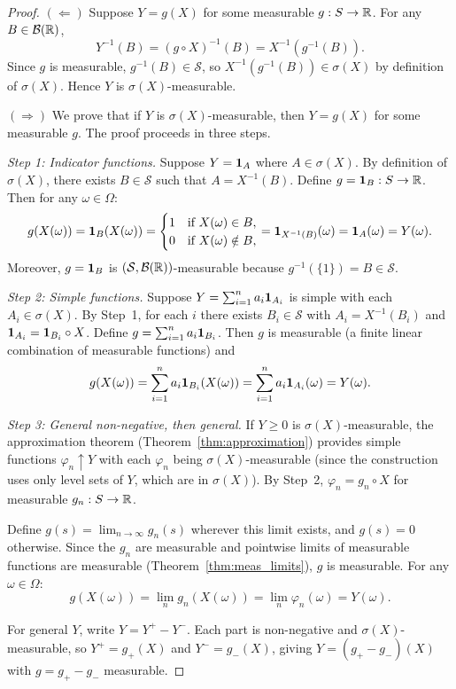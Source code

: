 \documentclass[11pt,a4paper]{article}
\begin{document}
\begin{proof}
$(\Leftarrow)$ Suppose $Y = g(X)$ for some measurable $g: S \to \mathbb{R}$.
For any $B \in \mathcal{B}(\mathbb{R})$,
\[
  Y^{-1}(B) = (g \circ X)^{-1}(B) = X^{-1}(g^{-1}(B)).
\]
Since $g$ is measurable, $g^{-1}(B) \in \mathcal{S}$, so
$X^{-1}(g^{-1}(B)) \in \sigma(X)$ by definition of $\sigma(X)$.
Hence $Y$ is $\sigma(X)$-measurable.

$(\Rightarrow)$ We prove that if $Y$ is $\sigma(X)$-measurable, then
$Y = g(X)$ for some measurable $g$. The proof proceeds in three steps.

\textit{Step 1: Indicator functions.}
Suppose $Y = \mathbf{1}_A$ where $A \in \sigma(X)$. By definition of
$\sigma(X)$, there exists $B \in \mathcal{S}$ such that $A = X^{-1}(B)$.
Define $g = \mathbf{1}_B: S \to \mathbb{R}$. Then for any $\omega \in \Omega$:
\[
  g(X(\omega)) = \mathbf{1}_B(X(\omega))
  = \begin{cases} 1 & \text{if } X(\omega) \in B, \\
                  0 & \text{if } X(\omega) \notin B, \end{cases}
  = \mathbf{1}_{X^{-1}(B)}(\omega) = \mathbf{1}_A(\omega) = Y(\omega).
\]
Moreover, $g = \mathbf{1}_B$ is $(\mathcal{S}, \mathcal{B}(\mathbb{R}))$-measurable
because $g^{-1}(\{1\}) = B \in \mathcal{S}$.

\textit{Step 2: Simple functions.}
Suppose $Y = \sum_{i=1}^n a_i \mathbf{1}_{A_i}$ is simple with each
$A_i \in \sigma(X)$. By Step~1, for each $i$ there exists
$B_i \in \mathcal{S}$ with $A_i = X^{-1}(B_i)$ and
$\mathbf{1}_{A_i} = \mathbf{1}_{B_i} \circ X$. Define
$g = \sum_{i=1}^n a_i \mathbf{1}_{B_i}$. Then $g$ is measurable (a finite
linear combination of measurable functions) and
\[
  g(X(\omega)) = \sum_{i=1}^n a_i \mathbf{1}_{B_i}(X(\omega))
  = \sum_{i=1}^n a_i \mathbf{1}_{A_i}(\omega) = Y(\omega).
\]

\textit{Step 3: General non-negative, then general.}
If $Y \geq 0$ is $\sigma(X)$-measurable, the approximation theorem
(Theorem~\ref{thm:approximation}) provides simple functions
$\varphi_n \uparrow Y$ with each $\varphi_n$ being $\sigma(X)$-measurable
(since the construction uses only level sets of $Y$, which are in
$\sigma(X)$). By Step~2, $\varphi_n = g_n \circ X$ for measurable
$g_n: S \to \mathbb{R}$.

Define $g(s) = \lim_{n \to \infty} g_n(s)$ wherever this limit exists,
and $g(s) = 0$ otherwise. Since the $g_n$ are measurable and pointwise
limits of measurable functions are measurable
(Theorem~\ref{thm:meas_limits}), $g$ is measurable. For any
$\omega \in \Omega$:
\[
  g(X(\omega)) = \lim_n g_n(X(\omega)) = \lim_n \varphi_n(\omega)
  = Y(\omega).
\]

For general $Y$, write $Y = Y^+ - Y^-$. Each part is non-negative and
$\sigma(X)$-measurable, so $Y^+ = g_+(X)$ and $Y^- = g_-(X)$, giving
$Y = (g_+ - g_-)(X)$ with $g = g_+ - g_-$ measurable.
\end{proof}
\end{document}
